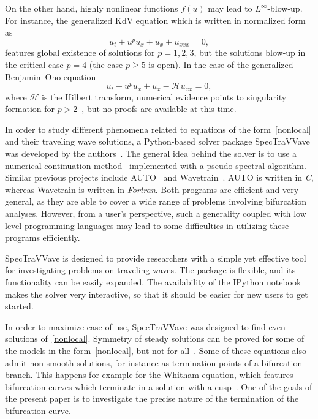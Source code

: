 On the other hand, highly nonlinear functions $f(u)$ may lead to $L^{\infty}$-blow-up.
For instance, the generalized KdV equation which is written in normalized form as
\begin{equation}
\label{kdv}
u_t + u^{p}u_x + u_x + u_{xxx} = 0,
\end{equation}
features global existence of solutions for $p=1,2,3$, 
but the solutions blow-up in the critical case $p=4$ (the case $p \ge 5$ is open).
In the case of the generalized Benjamin--Ono equation
\begin{equation*}
u_t + u^{p}u_x + u_x - \mathcal{H} u_{xx} = 0,
\end{equation*}
where $\mathcal{H}$ is the Hilbert transform, numerical evidence points to singularity formation 
for $p > 2$~\cite{BoKa}, but no proofs are available at this time. 


In order to study different phenomena related to equations of the form~\eqref{nonlocal} 
and their traveling wave solutions, a \textsf{Python}-based solver package \textsf{SpecTraVVave} 
was developed by the authors~\cite{github}. 
The general idea behind the solver is to use a numerical continuation method~\cite{Keller} 
implemented with a pseudo-spectral algorithm. 
Similar previous projects include \textsf{AUTO}~\cite{Doed97} and \textsf{Wavetrain}~\cite{Sherratt}.
\textsf{AUTO} is written in \emph{C}, whereas \textsf{Wavetrain} is written in \emph{Fortran}. 
Both programs are efficient and very general, as they are able to cover a wide range of problems
involving bifurcation analyses. However, from a user's perspective, 
such a generality coupled with low level programming languages
may lead to some difficulties in utilizing these programs efficiently.

\textsf{SpecTraVVave} is designed to provide researchers with a simple yet effective tool 
for investigating problems on traveling waves. The package is flexible, 
and its functionality can be easily expanded. 
The availability of the \textsf{IPython} notebook \cite{IPython} makes the solver very interactive,
so that it should be easier for new users to get started.

In order to maximize ease of use, \textsf{SpecTraVVave} was designed
to find even solutions of~\eqref{nonlocal}.
Symmetry of steady solutions can be proved for some of the models
in the form~\eqref{nonlocal}, but not for all~\cite{CB}.
Some of these equations also admit non-smooth solutions,
for instance as termination points of a bifurcation branch.
This happens for example for the Whitham equation, which features bifurcation
curves which terminate in a solution with a cusp~\cite{EW2016}.
One of the goals of the present paper is to investigate the
precise nature of the termination of the bifurcation curve.




